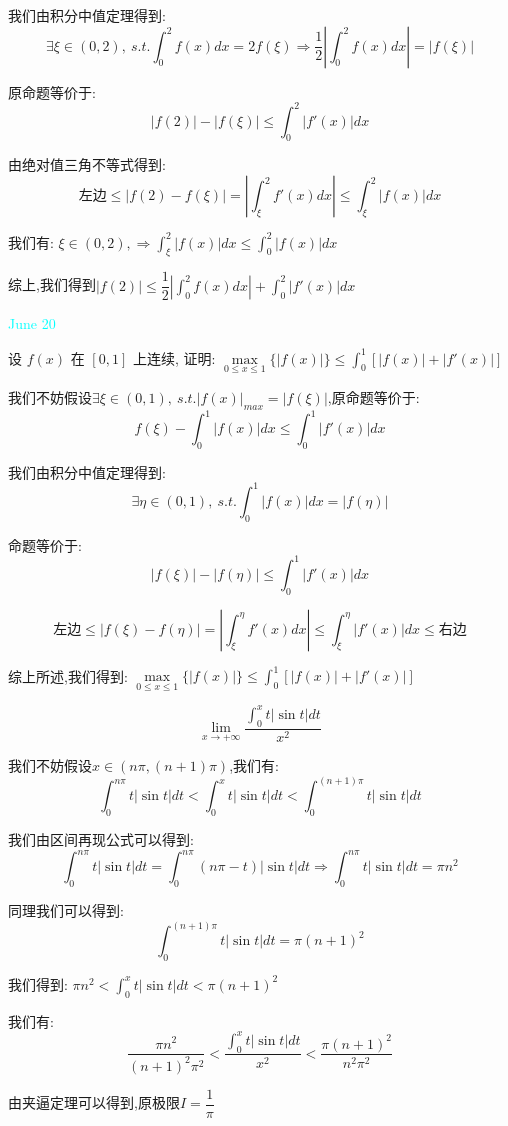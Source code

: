 \begin{solution}
	
	我们由积分中值定理得到: 
	$$\exists\xi\in(0,2),\ s.t. \int_{0}^{2}f(x)dx=2f(\xi)\Rightarrow \dfrac{1}{2}|\int_{0}^{2}f(x)dx|=|f(\xi)|$$
	
	原命题等价于: 
	$$|f(2)|-|f(\xi)|\leq \int_{0}^{2}|f'(x)|dx$$
	
	由绝对值三角不等式得到: 
	$$\text{左边}\leq |f(2)-f(\xi)|=|\int_{\xi}^{2}f'(x)dx|\leq \int_{\xi}^{2}|f(x)|dx$$
	
	我们有: $\xi\in(0,2),\Rightarrow \int_{\xi}^{2}|f(x)|dx\leq \int_{0}^{2}|f(x)|dx$
	
	综上,我们得到$|f(2)|\leq \dfrac{1}{2}|\int_{0}^{2}f(x)dx|+\int_{0}^{2}|f'(x)|dx$
\end{solution}


\textcolor{cyan}{June 20}

\begin{example}[][Exam: 32.3.11]
	设 $f(x)$ 在 $[0,1]$ 上连续, 证明: $\max\limits_{0\leq x\leq 1}\{|f(x)|\}\leq \int_{0}^{1}[|f(x)|+|f'(x)|]$

\end{example}

\begin{solution}
	
	我们不妨假设$\exists \xi\in(0,1),\ s.t. |f(x)|_{max}=|f(\xi)|$,原命题等价于: 
	$$f(\xi)-\int_{0}^{1}|f(x)|dx\leq \int_{0}^{1}|f'(x)|dx$$
	
	我们由积分中值定理得到: 
	$$\exists\eta\in(0,1),\ s.t. \int_{0}^{1}|f(x)|dx=|f(\eta)|$$
	
	命题等价于: 
	$$|f(\xi)|-|f(\eta)|\leq \int_{0}^{1}|f'(x)|dx$$
	
	$$\text{左边}\leq |f(\xi)-f(\eta)|=|\int_{\xi}^{\eta}f'(x)dx|\leq \int_{\xi}^{\eta}|f'(x)|dx\leq\text{右边}$$
	
	综上所述,我们得到: $\mathop{max}\limits_{0\leq x\leq 1}\{|f(x)|\}\leq \int_{0}^{1}[|f(x)|+|f'(x)|]$
\end{solution}

\begin{example}[][Exam: 32.3.12]
	$$\lim\limits_{x\to+\infty}\dfrac{\int_{0}^{x}t\big|\sin t\big|dt}{x^2}$$
\end{example}

\begin{solution}
	
	我们不妨假设$x\in(n\pi,(n+1)\pi)$,我们有: 
	$$\int_{0}^{n\pi}t|\sin t|dt< \int_{0}^{x}t|\sin t|dt<\int_{0}^{(n+1)\pi}t|\sin t|dt$$
	
	我们由区间再现公式可以得到: 
	$$\int_{0}^{n\pi}t|\sin t|dt=\int_{0}^{n\pi}(n\pi-t)|\sin t|dt\Rightarrow \int_{0}^{n\pi}t|\sin t|dt=\pi n^2$$
	
	同理我们可以得到: 
	$$\int_{0}^{(n+1)\pi}t|\sin t|dt=\pi (n+1)^2$$
	
	我们得到: $\pi n^2< \int_{0}^{x}t|\sin t|dt<\pi (n+1)^2$
	
	我们有: 
	$$\dfrac{\pi n^2}{(n+1)^2\pi^2}<\dfrac{\int_{0}^{x}t|\sin t|dt}{x^2}<\dfrac{\pi (n+1)^2}{n^2\pi^2}$$
	
	由夹逼定理可以得到,原极限$I=\dfrac{1}{\pi}$
\end{solution}


